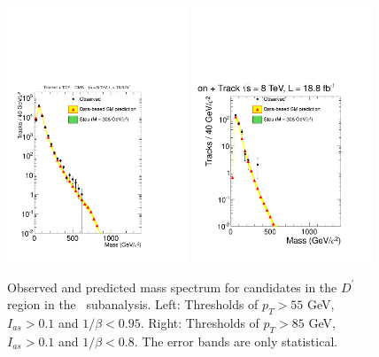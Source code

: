 \begin{figure}
 \begin{center}
  \includegraphics[clip=false, trim=0.0cm 0cm 0.0cm 0cm, width=0.48\textwidth]{figures/tkmu/RescaleNoRatio_Mass_Flip_8TeV_LooseNoSMMC}
  \includegraphics[clip=false, trim=0.0cm 0cm 0.0cm 0cm, width=0.48\textwidth]{figures/tkmu/RescaleNoRatio_Mass_Flip_8TeV_TightNoSMMC}
 \end{center}
 \caption[Observed and predicted mass spectrum for candidates in the \invbeta\ $<$ 1 region in the \tktof\ analysis.]
{Observed and predicted mass spectrum for candidates in the $D^\prime$ region in the \tktof\ subanalysis.
Left: Thresholds of $p_T > 55$ GeV, $I_{as} > 0.1$ and $1/\beta < 0.95$.
Right: Thresholds of $p_T > 85$ GeV, $I_{as} > 0.1$ and $1/\beta < 0.8$.
The error bands are only statistical.}
\label{fig:FlipMassDistribution}
\end{figure}

